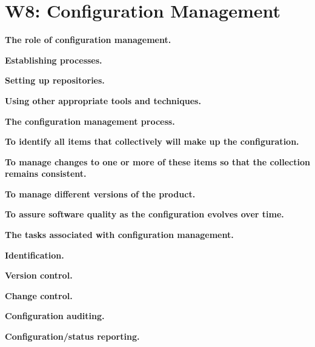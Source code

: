 \section{W8: Configuration Management}

\textbf{The role of configuration management.}

    \textbf{Establishing processes.}

    \textbf{Setting up repositories.}

    \textbf{Using other appropriate tools and techniques.}

\textbf{The configuration management process.}

    \textbf{To identify all items that collectively will make up the configuration.}

    \textbf{To manage changes to one or more of these items so that the collection remains consistent.}

    \textbf{To manage different versions of the product.}

    \textbf{To assure software quality as the configuration evolves over time.}

\textbf{The tasks associated with configuration management.}

    \textbf{Identification.}

    \textbf{Version control.}

    \textbf{Change control.}

    \textbf{Configuration auditing.}

    \textbf{Configuration/status reporting.}
